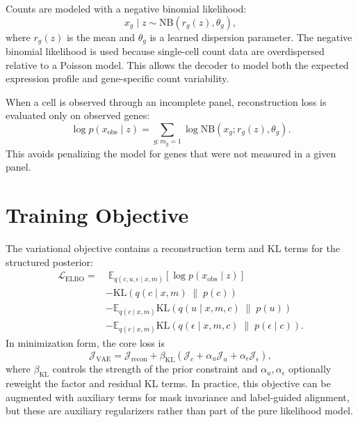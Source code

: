 \documentclass[11pt]{article}
\begin{document}
Counts are modeled with a negative binomial likelihood:
\begin{equation}
    x_g \mid z \sim \mathrm{NB}\left(r_g(z), \theta_g\right),
\end{equation}
where $r_g(z)$ is the mean and $\theta_g$ is a learned dispersion parameter. The negative binomial likelihood is used because single-cell count data are overdispersed relative to a Poisson model. This allows the decoder to model both the expected expression profile and gene-specific count variability.

When a cell is observed through an incomplete panel, reconstruction loss is evaluated only on observed genes:
\begin{equation}
    \log p(x_{\mathrm{obs}} \mid z) = \sum_{g:m_g=1} \log \mathrm{NB}\left(x_g; r_g(z), \theta_g\right).
\end{equation}
This avoids penalizing the model for genes that were not measured in a given panel.

\section{Training Objective}

The variational objective contains a reconstruction term and KL terms for the structured posterior:
\begin{align}
    \mathcal{L}_{\mathrm{ELBO}}
    =&\; \mathbb{E}_{q(c,u,\epsilon \mid x,m)}\left[\log p(x_{\mathrm{obs}} \mid z)\right] \\
    &- \mathrm{KL}\left(q(c \mid x,m) \;\|\; p(c)\right) \\
    &- \mathbb{E}_{q(c \mid x,m)}
       \mathrm{KL}\left(q(u \mid x,m,c) \;\|\; p(u)\right) \\
    &- \mathbb{E}_{q(c \mid x,m)}
       \mathrm{KL}\left(q(\epsilon \mid x,m,c) \;\|\; p(\epsilon \mid c)\right).
\end{align}
In minimization form, the core loss is
\begin{equation}
    \mathcal{J}_{\mathrm{VAE}}
    = \mathcal{J}_{\mathrm{recon}}
    + \beta_{\mathrm{KL}}\left(
        \mathcal{J}_{c}
        + \alpha_u \mathcal{J}_{u}
        + \alpha_{\epsilon} \mathcal{J}_{\epsilon}
      \right),
\end{equation}
where $\beta_{\mathrm{KL}}$ controls the strength of the prior constraint and $\alpha_u, \alpha_{\epsilon}$ optionally reweight the factor and residual KL terms. In practice, this objective can be augmented with auxiliary terms for mask invariance and label-guided alignment, but these are auxiliary regularizers rather than part of the pure likelihood model.
\end{document}
